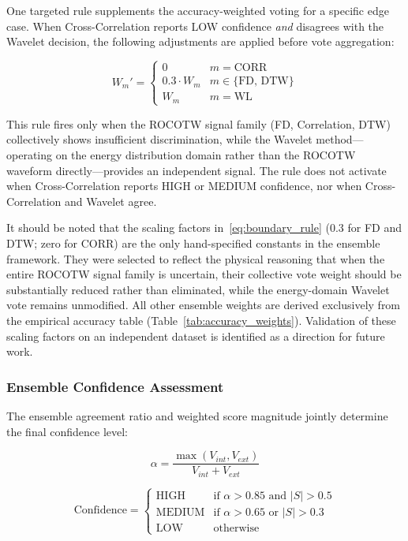 \documentclass[journal]{IEEEtran}
\begin{document}
One targeted rule supplements the accuracy-weighted voting for a specific
edge case. When Cross-Correlation reports LOW confidence \emph{and}
disagrees with the Wavelet decision, the following adjustments are
applied before vote aggregation:

\begin{equation}
W_m' = \begin{cases}
0              & m = \text{CORR} \\
0.3 \cdot W_m  & m \in \{\text{FD},\,\text{DTW}\} \\
W_m            & m = \text{WL}
\end{cases}
\label{eq:boundary_rule}
\end{equation}

This rule fires only when the ROCOTW signal family (FD, Correlation,
DTW) collectively shows insufficient discrimination, while the Wavelet
method---operating on the energy distribution domain rather than the
ROCOTW waveform directly---provides an independent signal. The rule
does not activate when Cross-Correlation reports HIGH or MEDIUM
confidence, nor when Cross-Correlation and Wavelet agree.

It should be noted that the scaling factors in~\eqref{eq:boundary_rule}
(0.3 for FD and DTW; zero for CORR) are the only hand-specified
constants in the ensemble framework. They were selected to reflect the
physical reasoning that when the entire ROCOTW signal family is
uncertain, their collective vote weight should be substantially reduced
rather than eliminated, while the energy-domain Wavelet vote remains
unmodified. All other ensemble weights are derived exclusively from the
empirical accuracy table (Table~\ref{tab:accuracy_weights}). Validation
of these scaling factors on an independent dataset is identified as a
direction for future work.

\subsubsection{Ensemble Confidence Assessment}

The ensemble agreement ratio and weighted score magnitude jointly
determine the final confidence level:

\begin{equation}
\alpha = \frac{\max(V_{int}, V_{ext})}{V_{int} + V_{ext}}
\end{equation}

\begin{equation}
\text{Confidence} = \begin{cases}
\text{HIGH}   & \text{if } \alpha > 0.85 \text{ and } |S| > 0.5 \\
\text{MEDIUM} & \text{if } \alpha > 0.65 \text{ or }  |S| > 0.3 \\
\text{LOW}    & \text{otherwise}
\end{cases}
\end{equation}
\end{document}

